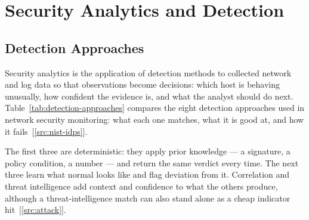\section{Security Analytics and Detection}
\label{sec:detection}

\subsection{Detection Approaches}
\label{sec:detection-approaches}

Security analytics is the application of detection methods to collected network and log data so that observations become decisions: which host is behaving unusually, how confident the evidence is, and what the analyst should do next. Table~\ref{tab:detection-approaches} compares the eight detection approaches used in network security monitoring: what each one matches, what it is good at, and how it fails~[\ref{src:nist-idps}].

The first three are deterministic: they apply prior knowledge --- a signature, a policy condition, a number --- and return the same verdict every time. The next three learn what normal looks like and flag deviation from it. Correlation and threat intelligence add context and confidence to what the others produce, although a threat-intelligence match can also stand alone as a cheap indicator hit~[\ref{src:attack}].

